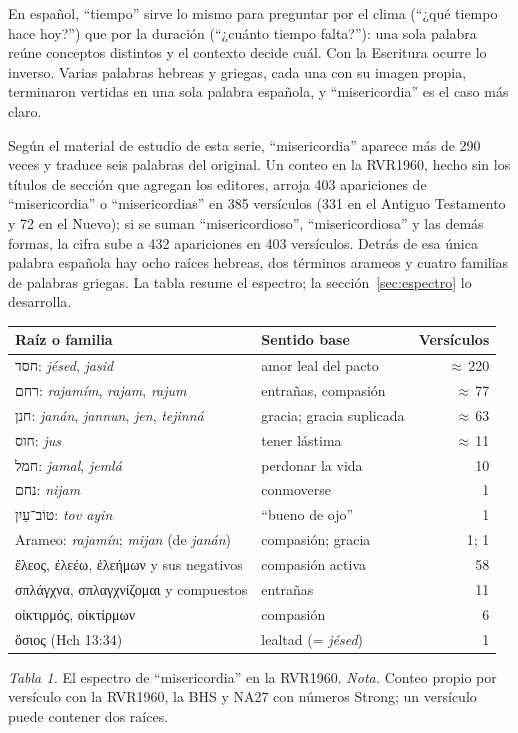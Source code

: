 \documentclass[11pt,letterpaper]{article}
\newcommand{\heb}[1]{\mbox{\foreignlanguage{hebrew}{#1}}}
\newcommand{\grc}[1]{\foreignlanguage{ancientgreek}{#1}}
\begin{document}
En español, ``tiempo'' sirve lo mismo para preguntar por el clima (``¿qué tiempo hace hoy?'') que por la duración (``¿cuánto tiempo falta?''): una sola palabra reúne conceptos distintos y el contexto decide cuál. Con la Escritura ocurre lo inverso. Varias palabras hebreas y griegas, cada una con su imagen propia, terminaron vertidas en una sola palabra española, y ``misericordia'' es el caso más claro.

Según el material de estudio de esta serie, ``misericordia'' aparece más de 290 veces y traduce seis palabras del original. Un conteo en la RVR1960, hecho sin los títulos de sección que agregan los editores, arroja 403 apariciones de ``misericordia'' o ``misericordias'' en 385 versículos (331 en el Antiguo Testamento y 72 en el Nuevo); si se suman ``misericordioso'', ``misericordiosa'' y las demás formas, la cifra sube a 432 apariciones en 403 versículos. Detrás de esa única palabra española hay ocho raíces hebreas, dos términos arameos y cuatro familias de palabras griegas. La tabla resume el espectro; la sección~\ref{sec:espectro} lo desarrolla.

\begin{center}\small\renewcommand{\arraystretch}{1.18}
\begin{tabular}{@{}L{5.2cm}L{4.4cm}r@{}}
\toprule
\textbf{Raíz o familia} & \textbf{Sentido base} & \textbf{Versículos} \\ \midrule
\heb{חסד}: \emph{jésed}, \emph{jasid} & amor leal del pacto & $\approx$\,220 \\
\heb{רחם}: \emph{rajamím}, \emph{rajam}, \emph{rajum} & entrañas, compasión & $\approx$\,77 \\
\heb{חנן}: \emph{janán}, \emph{jannun}, \emph{jen}, \emph{tejinná} & gracia; gracia suplicada & $\approx$\,63 \\
\heb{חוס}: \emph{jus} & tener lástima & $\approx$\,11 \\
\heb{חמל}: \emph{jamal}, \emph{jemlá} & perdonar la vida & 10 \\
\heb{נחם}: \emph{nijam} & conmoverse & 1 \\
\heb{טוֹב־עַיִן}: \emph{tov ayin} & ``bueno de ojo'' & 1 \\
Arameo: \emph{rajamín}; \emph{mijan} (de \emph{janán}) & compasión; gracia & 1; 1 \\
\grc{ἔλεος}, \grc{ἐλεέω}, \grc{ἐλεήμων} y sus negativos & compasión activa & 58 \\
\grc{σπλάγχνα}, \grc{σπλαγχνίζομαι} y compuestos & entrañas & 11 \\
\grc{οἰκτιρμός}, \grc{οἰκτίρμων} & compasión & 6 \\
\grc{ὅσιος} (Hch 13:34) & lealtad (= \emph{jésed}) & 1 \\
\bottomrule
\end{tabular}\par
{\footnotesize\color{gris}\textit{Tabla 1.} El espectro de ``misericordia'' en la RVR1960. \textit{Nota.} Conteo propio por versículo con la RVR1960, la BHS y NA27 con números Strong; un versículo puede contener dos raíces.}
\end{center}
\end{document}
